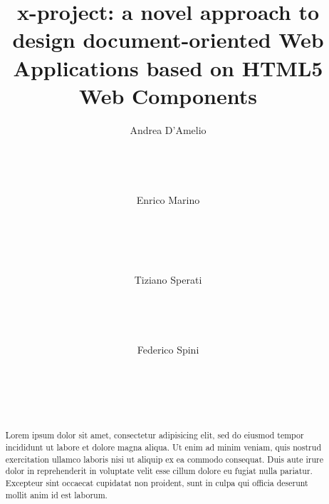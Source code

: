 \documentclass{sig-alternate}
\begin{document}
\title{x-project: a novel approach to design document-oriented Web Applications based on HTML5 Web Components}


\author{
\alignauthor
Andrea D'Amelio\\
  \\
  \\
  \\
  \\
\alignauthor
Enrico Marino\\
  \\
  \\
  \\
  \\
\and
\alignauthor
Tiziano Sperati\\
  \\
  \\
  \\
  \\
\alignauthor
Federico Spini\\
  \\
  \\
  \\
  \\
}





\maketitle
\begin{abstract}
Lorem ipsum dolor sit amet, consectetur adipisicing elit, sed do eiusmod
tempor incididunt ut labore et dolore magna aliqua. Ut enim ad minim veniam,
quis nostrud exercitation ullamco laboris nisi ut aliquip ex ea commodo
consequat. Duis aute irure dolor in reprehenderit in voluptate velit esse
cillum dolore eu fugiat nulla pariatur. Excepteur sint occaecat cupidatat non
proident, sunt in culpa qui officia deserunt mollit anim id est laborum.


\end{abstract}
\end{document}
